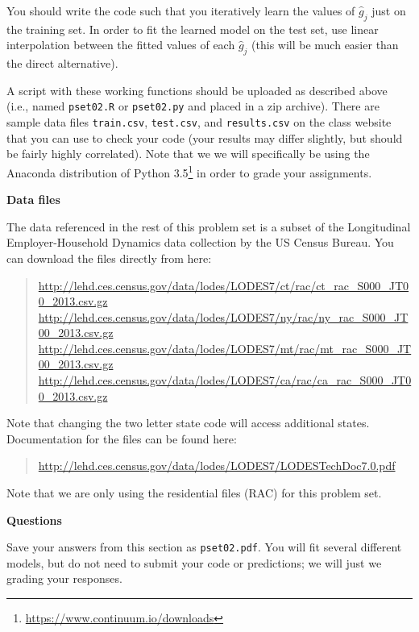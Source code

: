 \documentclass[12pt]{article}
\begin{document}
You should write the code such that you iteratively learn the values of
$\widehat{g}_j$ just on the training set. In order to fit the learned
model on the test set, use linear interpolation between the fitted
values of each $\widehat{g}_j$ (this will be much easier than the
direct alternative).

A script with these
working functions should be uploaded as described above (i.e., named
\texttt{pset02.R} or \texttt{pset02.py} and placed in a zip archive).
There are sample data files \texttt{train.csv}, \texttt{test.csv},
and \texttt{results.csv} on the class website that you can use to check
your code (your results may differ slightly, but should be fairly highly
correlated). Note that we we will specifically be using the
Anaconda distribution of Python 3.5\footnote{\url{https://www.continuum.io/downloads}}
in order to grade your assignments.

\medskip

\textbf{Data files}

The data referenced in the rest of this problem set is a subset of the
Longitudinal Employer-Household Dynamics data collection by
the US Census Bureau. You can download the files directly from
here:
\begin{quote}
\url{http://lehd.ces.census.gov/data/lodes/LODES7/ct/rac/ct_rac_S000_JT00_2013.csv.gz} \\
\url{http://lehd.ces.census.gov/data/lodes/LODES7/ny/rac/ny_rac_S000_JT00_2013.csv.gz} \\
\url{http://lehd.ces.census.gov/data/lodes/LODES7/mt/rac/mt_rac_S000_JT00_2013.csv.gz} \\
\url{http://lehd.ces.census.gov/data/lodes/LODES7/ca/rac/ca_rac_S000_JT00_2013.csv.gz}
\end{quote}
Note that changing the two letter state code will access additional states.
Documentation for the files can be found here:
\begin{quote}
\url{http://lehd.ces.census.gov/data/lodes/LODES7/LODESTechDoc7.0.pdf}
\end{quote}
Note that we are only using the residential files (RAC) for this problem set.

\textbf{Questions}

Save your answers from this section as \texttt{pset02.pdf}. You will fit several
different models, but do not need to submit your code or predictions; we will
just we grading your responses.
\end{document}
